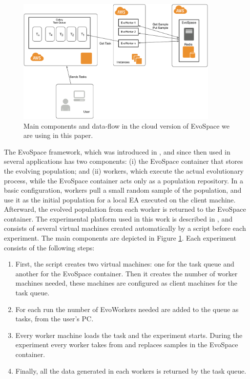 \documentclass[graybox]{svmult}
\begin{document}
\begin{figure}[h!tbp]
    \centering
        \includegraphics[width=10cm]{img/EvoSpaceAWS.png}
    \caption{Main components and data-flow in the cloud version of EvoSpace we are using in this paper.}
    \label{fig:evospace}
  \end{figure}
The EvoSpace framework, which was introduced in \cite{Evospace}, and
since then used in several applications \cite{GValdez2015} has two components: (i) the EvoSpace
container that stores the evolving population; and (ii) workers, which execute
the actual evolutionary process, while the EvoSpace container acts only as a population repository.
In a basic configuration, workers pull a small random sample of the
population, and use it as the initial population for a local EA executed
on the client machine. Afterward, the evolved population from each worker
is returned to the EvoSpace container. The experimental platform used in this work is
described in \cite{valenzuela2015implementing}, and consists of several virtual machines
created automatically by a script before each experiment. The main components are depicted
in Figure \ref{fig:evospace}. Each experiment consists of the following steps:

\begin{enumerate}
    \item First, the script creates two virtual machines: one for the task queue and another
    for the EvoSpace container. Then it creates the number of worker machines needed, these
    machines are configured as client machines for the task queue.
    \item For each run the number of EvoWorkers needed are added to the queue as tasks, from
    the user's PC.
    \item Every worker machine loads the task and the experiment
      starts. During the experiment every worker takes from and replaces
      samples in the EvoSpace container.
    \item Finally, all the data generated in each workers is returned by the task queue.
    \end{enumerate}
\end{document}
